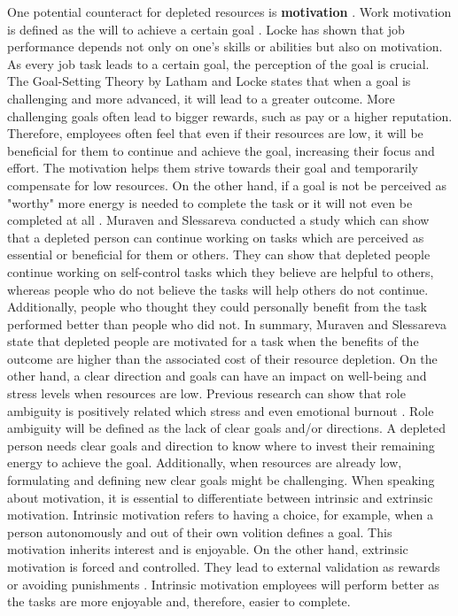 \documentclass{hasel_thesis}
\begin{document}
One potential counteract for depleted resources is \textbf{motivation} \cite{Bandura.1986}. Work motivation is defined as the will to achieve a certain goal \cite{Locke.2004}. Locke \cite{Locke2000} has shown that job performance depends not only on one's skills or abilities but also on motivation. As every job task leads to a certain goal, the perception of the goal is crucial. The Goal-Setting Theory by Latham and Locke \cite{Latham.1991} states that when a goal is challenging and more advanced, it will lead to a greater outcome. More challenging goals often lead to bigger rewards, such as pay or a higher reputation. Therefore, employees often feel that even if their resources are low, it will be beneficial for them to continue and achieve the goal, increasing their focus and effort. The motivation helps them strive towards their goal and temporarily compensate for low resources. On the other hand, if a goal is not be perceived as "worthy" more energy is needed to complete the task or it will not even be completed at all \cite{Trougakos.2009}. Muraven and Slessareva \cite{Muraven.2003} conducted a study which can show that a depleted person can continue working on tasks which are perceived as essential or beneficial for them or others. They can show that depleted people continue working on self-control tasks which they believe are helpful to others, whereas people who do not believe the tasks will help others do not continue. Additionally, people who thought they could personally benefit from the task performed better than people who did not. In summary, Muraven and Slessareva \cite{Muraven.2003} state that depleted people are motivated for a task when the benefits of the outcome are higher than the associated cost of their resource depletion. On the other hand, a clear direction and goals can have an impact on well-being and stress levels when resources are low. Previous research can show that role ambiguity is positively related which stress and even emotional burnout \cite{Posig.2003}. Role ambiguity will be defined as the lack of clear goals and/or directions. A depleted person needs clear goals and direction to know where to invest their remaining energy to achieve the goal. Additionally, when resources are already low, formulating and defining new clear goals might be challenging. When speaking about motivation, it is essential to differentiate between intrinsic and extrinsic motivation. Intrinsic motivation refers to having a choice, for example, when a person autonomously and out of their own volition defines a goal. This motivation inherits interest and is enjoyable. On the other hand, extrinsic motivation is forced and controlled. They lead to external validation as rewards or avoiding punishments \cite{Ryan.2000}. Intrinsic motivation employees will perform better as the tasks are more enjoyable and, therefore, easier to complete.
\end{document}
